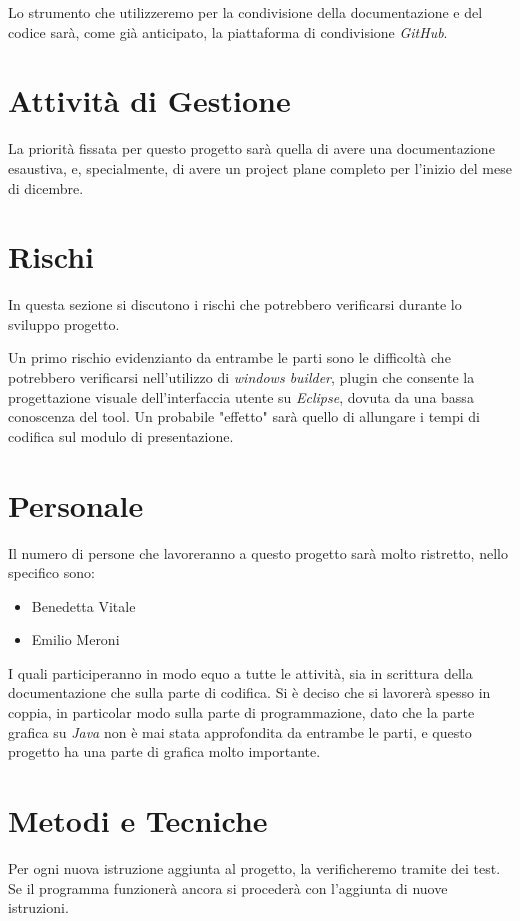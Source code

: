 \documentclass{book}
\begin{document}
 Lo strumento che utilizzeremo per la condivisione della documentazione e del codice sarà, come già anticipato, la piattaforma di condivisione \textit{GitHub}.

\section{Attività di Gestione}

La priorità fissata per questo progetto sarà quella di avere una documentazione esaustiva, e, specialmente, di avere un project plane completo per l'inizio del mese di dicembre.


\section{Rischi}

In questa sezione si discutono i rischi che potrebbero verificarsi durante lo sviluppo progetto. 

Un primo rischio evidenzianto da entrambe le parti sono le difficoltà che potrebbero verificarsi nell'utilizzo di \textit{windows builder}, plugin che consente la progettazione visuale dell'interfaccia utente su \textit{Eclipse}, dovuta da una bassa conoscenza del tool. Un probabile "effetto" sarà quello di allungare i tempi di codifica sul modulo di presentazione.

\section{Personale}
Il numero di persone che lavoreranno a questo progetto sarà molto ristretto, nello specifico sono: 
\begin{itemize}
    \item Benedetta Vitale
    \item Emilio Meroni
\end{itemize}
I quali participeranno in modo equo a tutte le attività, sia in scrittura della documentazione che sulla parte di codifica. Si è deciso che si lavorerà spesso in coppia, in particolar modo sulla parte di programmazione, dato che la parte grafica su \textit{Java} non è mai stata approfondita da entrambe le parti, e questo progetto ha una parte di grafica molto importante.
     

\section{Metodi e Tecniche}

Per ogni nuova istruzione aggiunta al progetto, la verificheremo tramite dei test.
Se il programma funzionerà ancora si procederà con l'aggiunta di nuove istruzioni.
\end{document}
